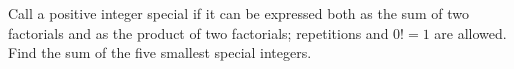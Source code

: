 Call a positive integer special if it can be expressed both as the sum of two factorials and as the product of two factorials; repetitions and $0!=1$ are allowed. Find the sum of the five smallest special integers.
